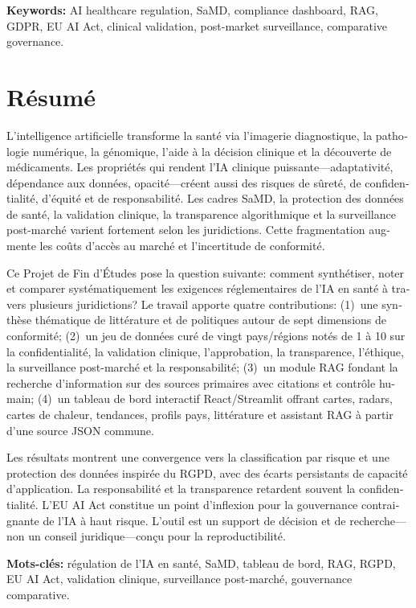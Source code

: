 \documentclass[12pt,a4paper,oneside]{report}
\begin{document}
\vspace{0.4cm}
\textbf{Keywords:} AI healthcare regulation, SaMD, compliance dashboard, RAG, GDPR, EU AI Act, clinical validation, post-market surveillance, comparative governance.

\clearpage

\chapter*{R\'esum\'e}
\begin{otherlanguage}{french}

L'intelligence artificielle transforme la sant\'e via l'imagerie diagnostique, la pathologie num\'erique, la g\'enomique, l'aide \`a la d\'ecision clinique et la d\'ecouverte de m\'edicaments. Les propri\'et\'es qui rendent l'IA clinique puissante---adaptativit\'e, d\'ependance aux donn\'ees, opacit\'e---cr\'eent aussi des risques de s\^uret\'e, de confidentialit\'e, d'\'equit\'e et de responsabilit\'e. Les cadres SaMD, la protection des donn\'ees de sant\'e, la validation clinique, la transparence algorithmique et la surveillance post-march\'e varient fortement selon les juridictions. Cette fragmentation augmente les co\^uts d'acc\`es au march\'e et l'incertitude de conformit\'e.

Ce Projet de Fin d'\'Etudes pose la question suivante: comment synth\'etiser, noter et comparer syst\'ematiquement les exigences r\'eglementaires de l'IA en sant\'e \`a travers plusieurs juridictions? Le travail apporte quatre contributions: (1)~une synth\`ese th\'ematique de litt\'erature et de politiques autour de sept dimensions de conformit\'e; (2)~un jeu de donn\'ees cur\'e de vingt pays/r\'egions not\'es de 1 \`a 10 sur la confidentialit\'e, la validation clinique, l'approbation, la transparence, l'\'ethique, la surveillance post-march\'e et la responsabilit\'e; (3)~un module RAG fondant la recherche d'information sur des sources primaires avec citations et contr\^ole humain; (4)~un tableau de bord interactif React/Streamlit offrant cartes, radars, cartes de chaleur, tendances, profils pays, litt\'erature et assistant RAG \`a partir d'une source JSON commune.

Les r\'esultats montrent une convergence vers la classification par risque et une protection des donn\'ees inspir\'ee du RGPD, avec des \'ecarts persistants de capacit\'e d'application. La responsabilit\'e et la transparence retardent souvent la confidentialit\'e. L'EU AI Act constitue un point d'inflexion pour la gouvernance contraignante de l'IA \`a haut risque. L'outil est un support de d\'ecision et de recherche---non un conseil juridique---con\c{c}u pour la reproductibilit\'e.

\vspace{0.4cm}
\textbf{Mots-cl\'es:} r\'egulation de l'IA en sant\'e, SaMD, tableau de bord, RAG, RGPD, EU AI Act, validation clinique, surveillance post-march\'e, gouvernance comparative.
\end{otherlanguage}
\end{document}
